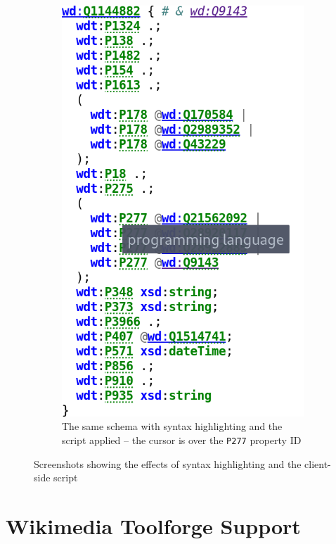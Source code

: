 \begin{figure}[t]
\begin{subfigure}[t]{0.45\textwidth}
    \includegraphics[trim={0 2.5cm 0 0},clip]{screenshots/shexc-with-syntax-highlighting}
    \caption[The same \gls{schema} with syntax highlighting and the script applied]{
      The same \gls{schema} with syntax highlighting and the script applied –
      the cursor is over the \lstinline{P277} \gls{property ID}
    }
    \label{fig:shexc-syntax-highlighting-with}
  \end{subfigure}
  \caption{
    Screenshots showing the effects of syntax highlighting and the client-side script
  }
  \label{fig:shexc-syntax-highlighting}
\end{figure}

\section{\gls{Wikimedia Toolforge} Support}
\label{sec:wdsi:Toolforge}

